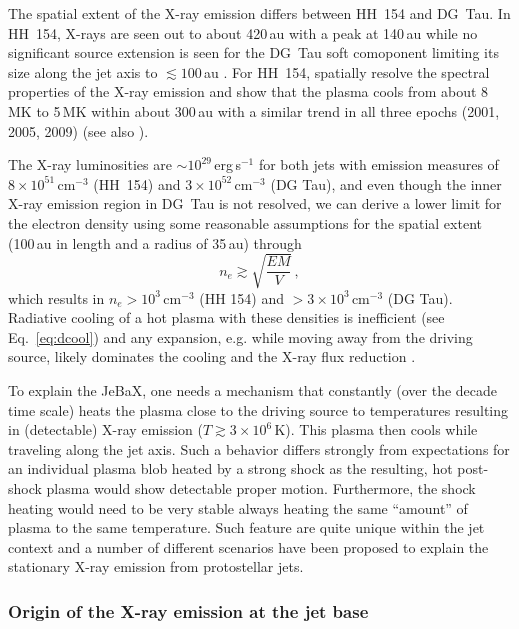 The spatial extent of the X-ray emission differs between HH~154 and DG~Tau. In
HH~154, X-rays are seen out to about 420\,au with a peak at 140\,au \citep{Schneider_2011} while no significant source extension is seen for the DG~Tau soft comoponent limiting its size along the jet axis to $\lesssim100\,$au \citep{Schneider_2008}. For HH~154, \citet{Schneider_2011} spatially resolve the spectral properties of the X-ray emission and show that the plasma cools from about 8\,MK to 5\,MK within about 300\,au with a similar trend in all three epochs (2001, 2005, 2009) (see also \cite{Bonito_2011}).


The X-ray luminosities are $\sim10^{29}$\,erg\,s$^{-1}$ for both jets with emission measures of $8\times10^{51}\,$cm$^{-3}$ (HH~154) and $3\times10^{52}$\,cm$^{-3}$ (DG Tau), and even though the inner X-ray emission region in DG~Tau is not resolved, we can derive a lower limit for the electron density using some reasonable assumptions for the spatial extent (100\,au in length and a radius of 35\,au) through 
\begin{equation}
n_e \gtrsim \sqrt{\frac{EM}{V}}\,,
\end{equation}
which results in $n_e>10^3\,$cm$^{-3}$  (HH 154) and $>3\times10^3\,$cm$^{-3}$ (DG Tau). Radiative cooling of a hot plasma with these densities is inefficient  (see Eq.~\ref{eq:dcool}) and any expansion, e.g. while moving away from the driving source, likely dominates the cooling and the X-ray flux reduction \citep{Guedel_2008, Schneider_2011}. 

To explain the JeBaX, one needs a mechanism that constantly (over the decade time scale)  heats the plasma close to the driving source to temperatures resulting in (detectable) X-ray emission ($T\gtrsim3\times10^6$\,K). This plasma then cools while traveling along the jet axis. Such a behavior differs strongly from expectations for an individual plasma blob heated by a strong shock as the resulting, hot post-shock plasma would show detectable proper motion. Furthermore, the shock heating would need to be very stable always heating the same ``amount'' of plasma to the same temperature. Such feature are quite unique within the jet context and a number of different scenarios have been proposed to explain the stationary X-ray emission from protostellar jets.



\subsubsection{Origin of the X-ray emission at the jet base}

